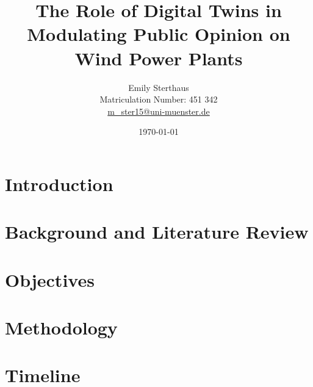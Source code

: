 \documentclass[12pt]{article}
\title{The Role of Digital Twins in Modulating Public Opinion on Wind Power Plants}
\author{Emily Sterthaus \\ Matriculation Number: 451 342 \\ \href{mailto:m_ster15@uni-muenster.de}{m\_ster15@uni-muenster.de}}
\date{\today}
\begin{document}
\maketitle


\newpage

\section{Introduction}


\section{Background and Literature Review}


\section{Objectives}


\section{Methodology}


\section{Timeline}
\end{document}
